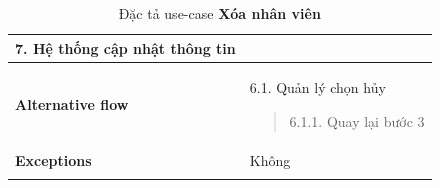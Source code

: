 \begin{longtable}{| p{} | p{} |}
                    7. Hệ thống cập nhật thông tin
                \\
                \hline
                    \textbf{Alternative flow}
                &
                    6.1. Quản lý chọn hủy
                    \begin{quote}
                        6.1.1. Quay lại bước 3
                    \end{quote} 
                \\
                \hline
                    \textbf{Exceptions} 
                &
                    Không
                \\
                \hline
                \caption{Đặc tả use-case \textbf{Xóa nhân viên}}
            \end{longtable}
    
 
